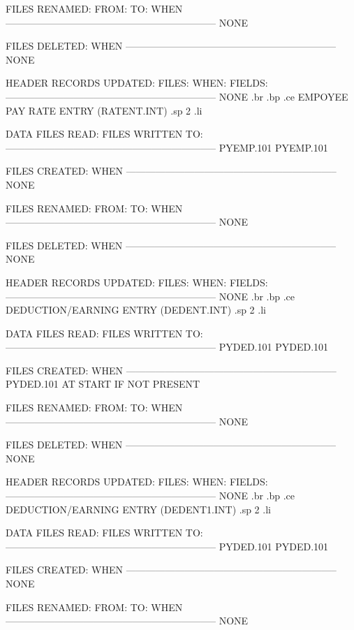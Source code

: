 FILES RENAMED:
  FROM:        TO:		  WHEN
-----------------------------------------------------------------
     NONE


FILES DELETED:			  WHEN
-----------------------------------------------------------------
     NONE


HEADER RECORDS UPDATED:
FILES:		 WHEN:		    FIELDS:
-----------------------------------------------------------------
     NONE
.br
.bp
.ce
EMPOYEE PAY RATE ENTRY	(RATENT.INT)
.sp 2
.li

DATA FILES READ:		   FILES WRITTEN TO:
-----------------------------------------------------------------
       PYEMP.101			PYEMP.101

FILES CREATED:			  WHEN
-----------------------------------------------------------------
       NONE


FILES RENAMED:
  FROM:        TO:		  WHEN
-----------------------------------------------------------------
     NONE


FILES DELETED:			  WHEN
-----------------------------------------------------------------
     NONE


HEADER RECORDS UPDATED:
FILES:		 WHEN:		    FIELDS:
-----------------------------------------------------------------
     NONE
.br
.bp
.ce
DEDUCTION/EARNING ENTRY  (DEDENT.INT)
.sp 2
.li

DATA FILES READ:		   FILES WRITTEN TO:
-----------------------------------------------------------------
       PYDED.101			PYDED.101

FILES CREATED:			  WHEN
-----------------------------------------------------------------
       PYDED.101	      AT START IF NOT PRESENT


FILES RENAMED:
  FROM:        TO:		  WHEN
-----------------------------------------------------------------
     NONE


FILES DELETED:			  WHEN
-----------------------------------------------------------------
     NONE


HEADER RECORDS UPDATED:
FILES:		 WHEN:		    FIELDS:
-----------------------------------------------------------------
     NONE
.br
.bp
.ce
DEDUCTION/EARNING ENTRY  (DEDENT1.INT)
.sp 2
.li

DATA FILES READ:		   FILES WRITTEN TO:
-----------------------------------------------------------------
       PYDED.101			PYDED.101

FILES CREATED:			  WHEN
-----------------------------------------------------------------
       NONE


FILES RENAMED:
  FROM:        TO:		  WHEN
-----------------------------------------------------------------
     NONE


